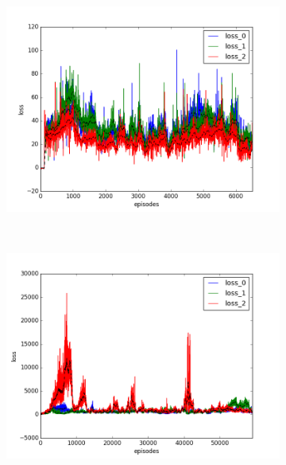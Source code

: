 \begin{figure}[t]
  \vspace{-0.5cm}
  \begin{subfigure}[t]{\figscale\linewidth}
    \hspace*{-2.75cm}
    \includegraphics[width=1.5\textwidth]
    {../results/dqn_1vs2/loss.png}
    \label{fig:dqn-1vs2-loss}
  \end{subfigure}
  ~
  \begin{subfigure}[t]{\figscale\linewidth}
    \hspace*{-1.4cm}
    \includegraphics[width=1.5\textwidth]
    {../results/ddpg_1vs2/loss.png}
    \label{fig:ddpg-1vs2-loss}
  \end{subfigure}
  ~
  \begin{subfigure}[t]{\figscale\linewidth}

\end{subfigure}
\end{figure}
